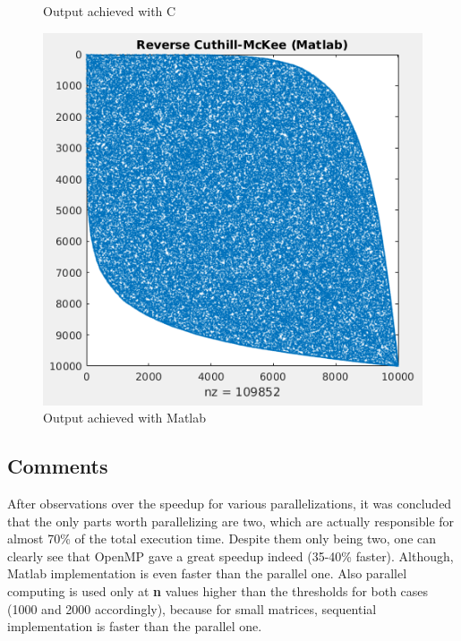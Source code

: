 \documentclass[letterpaper,12pt]{article}
\begin{document}
\begin{figure}[!htb]
\begin{minipage}[b]{0.32\textwidth}
		\caption{Output achieved with C}
		\label{fig:output_c}
	\end{minipage}
	\hfill
	\begin{minipage}[b]{0.32\textwidth}
		\includegraphics[width=\textwidth]{images/out_matlab.png}
		\caption{Output achieved with Matlab}
		\label{fig:output_matlab}
	\end{minipage}
\end{figure}

\subsection{Comments}
\vspace{2mm} %

After observations over the speedup for various parallelizations, it was concluded that the only parts worth parallelizing are two, which are actually responsible for almost 70\% of the total execution time. Despite them only being two, one can clearly see that OpenMP gave a great speedup indeed (35-40\% faster). Although, Matlab implementation is even faster than the parallel one. Also parallel computing is used only at \textbf{n} values higher than the thresholds for both cases (1000 and 2000 accordingly), because for small matrices, sequential implementation is faster than the parallel one.
\end{document}
